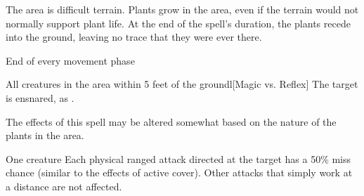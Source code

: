 \begin{spellheader}
    \spelldur{\durshort \dismissable}
\end{spellheader}
\begin{spelleffects}
    \spellline
    \spelleffect The area is difficult terrain. Plants grow in the area, even if the terrain would not normally support plant life. At the end of the spell's duration, the plants recede into the ground, leaving no trace that they were ever there.
    \begin{spelltrigger}{End of every movement phase}
        \begin{spelltarget}{All creatures in the area within 5 feet of the ground}l[Magic vs. Reflex]
            \spellsuccess The target is ensnared, as .
        \end{spelltarget}
    \end{spelltrigger}
\end{spelleffects}
\begin{spellfooter}
    \spellnotes The effects of this spell may be altered somewhat based on the nature of the plants in the area.
\end{spellfooter}

\begin{spellheader}
    \spelldur{\durshort \dismissable}
\end{spellheader}
\begin{spelleffects}
    \begin{spelltarget}{One creature}
        \spelleffect Each physical ranged attack directed at the target has a 50\% miss chance (similar to the effects of active cover). Other attacks that simply work at a distance are not affected.
    \end{spelltarget}
\end{spelleffects}

